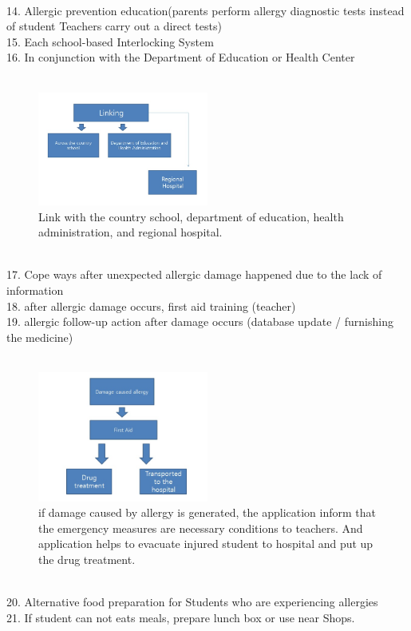 \documentclass[a4paper,11pt]{IEEEtran}
\begin{document}
{\begin{figure}[!h]
        \label{fig1}
\end{figure}
~\\
14. Allergic prevention education(parents perform allergy diagnostic tests instead of student Teachers carry out a direct tests)\\
15. Each school-based Interlocking System\\
16. In conjunction with the Department of Education or Health Center\\
~\\
\begin{figure}[!h]
        \centering
        \includegraphics[width=0.5\textwidth, height=0.6\textheight]{s4.jpg}
        \caption{Link with the country school, department of education, health administration, and regional hospital.}
        \label{fig1}
\end{figure}
~\\
17. Cope ways after unexpected allergic damage happened due to the lack of information\\
18. after allergic damage occurs, first aid training (teacher)\\
19. allergic follow-up action after damage occurs (database update / furnishing the medicine)\\
~\\
\begin{figure}[!h]
        \centering
        \includegraphics[width=0.5\textwidth, height=0.3\textheight]{s5.jpg}
        \caption{if damage caused by allergy is generated, the application inform that the emergency measures are necessary conditions to teachers. And application helps to evacuate injured student to hospital and put up the drug treatment. }
        \label{fig1}
\end{figure}
~\\
20. Alternative food preparation for Students who are experiencing allergies\\
21. If student can not eats meals, prepare lunch box or use near Shops.\\

}
\end{document}
